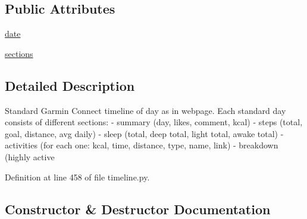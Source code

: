 \subsection*{Public Attributes}
\begin{DoxyCompactItemize}
\item 
\hyperlink{classpygce_1_1models_1_1garmin_1_1timeline_1_1_g_c_day_timeline_a93fbc84cc4bfb4b01ec4678c512dc6f7}{date}
\item 
\hyperlink{classpygce_1_1models_1_1garmin_1_1timeline_1_1_g_c_day_timeline_a2e73f290ffe476624ddc495bb3edd19b}{sections}
\end{DoxyCompactItemize}


\subsection{Detailed Description}
\begin{DoxyVerb}Standard Garmin Connect timeline of day as in webpage.
Each standard day consists of different sections:
- summary (day, likes, comment, kcal)
- steps (total, goal, distance, avg daily)
- sleep (total, deep total, light total, awake total)
- activities (for each one: kcal, time, distance, type, name, link)
- breakdown (highly active %
\end{DoxyVerb}
 

Definition at line 458 of file timeline.\+py.



\subsection{Constructor \& Destructor Documentation}
